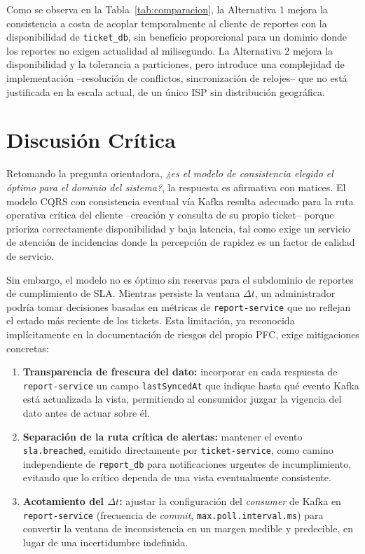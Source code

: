\documentclass[12pt, a4paper]{article}
\begin{document}
Como se observa en la Tabla~\ref{tab:comparacion}, la Alternativa 1 mejora la consistencia a costa de acoplar temporalmente al cliente de reportes con la disponibilidad de \texttt{ticket\_db}, sin beneficio proporcional para un dominio donde los reportes no exigen actualidad al milisegundo. La Alternativa 2 mejora la disponibilidad y la tolerancia a particiones, pero introduce una complejidad de implementación --resolución de conflictos, sincronización de relojes-- que no está justificada en la escala actual, de un único ISP sin distribución geográfica.

\section{Discusión Crítica}
Retomando la pregunta orientadora, \textit{¿es el modelo de consistencia elegido el óptimo para el dominio del sistema?}, la respuesta es afirmativa con matices. El modelo CQRS con consistencia eventual vía Kafka resulta adecuado para la ruta operativa crítica del cliente --creación y consulta de su propio ticket-- porque prioriza correctamente disponibilidad y baja latencia, tal como exige un servicio de atención de incidencias donde la percepción de rapidez es un factor de calidad de servicio.

Sin embargo, el modelo no es óptimo sin reservas para el subdominio de reportes de cumplimiento de SLA. Mientras persiste la ventana \(\Delta t\), un administrador podría tomar decisiones basadas en métricas de \texttt{report-service} que no reflejan el estado más reciente de los tickets. Esta limitación, ya reconocida implícitamente en la documentación de riesgos del propio PFC, exige mitigaciones concretas:

\begin{enumerate}
    \item \textbf{Transparencia de frescura del dato:} incorporar en cada respuesta de \texttt{report-service} un campo \texttt{lastSyncedAt} que indique hasta qué evento Kafka está actualizada la vista, permitiendo al consumidor juzgar la vigencia del dato antes de actuar sobre él.
    \item \textbf{Separación de la ruta crítica de alertas:} mantener el evento \texttt{sla.breached}, emitido directamente por \texttt{ticket-service}, como camino independiente de \texttt{report\_db} para notificaciones urgentes de incumplimiento, evitando que lo crítico dependa de una vista eventualmente consistente.
    \item \textbf{Acotamiento del \(\Delta t\):} ajustar la configuración del \textit{consumer} de Kafka en \texttt{report-service} (frecuencia de \textit{commit}, \texttt{max.poll.interval.ms}) para convertir la ventana de inconsistencia en un margen medible y predecible, en lugar de una incertidumbre indefinida.
\end{enumerate}
\end{document}
